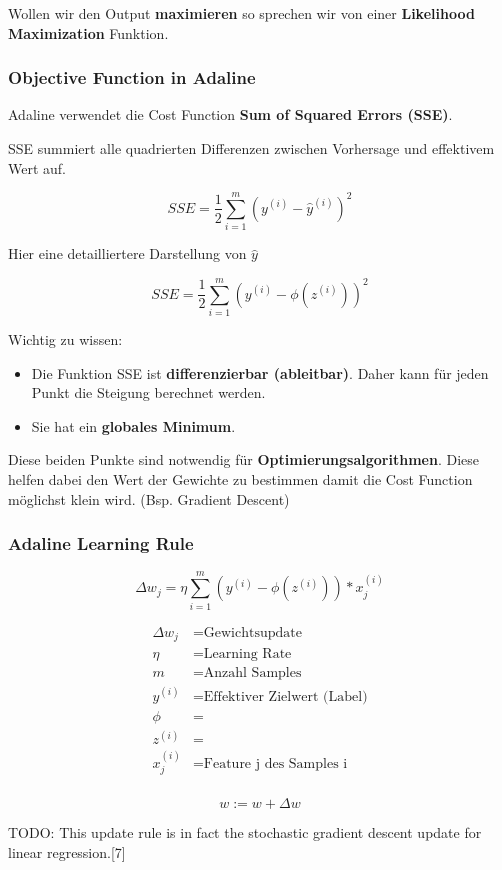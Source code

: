 Wollen wir den Output \textbf{maximieren} so sprechen wir von einer \textbf{Likelihood Maximization} Funktion.



 
\newpage
\subsubsection{Objective Function in Adaline}

Adaline verwendet die Cost Function \textbf{Sum of Squared Errors (SSE)}.

SSE summiert alle quadrierten Differenzen zwischen Vorhersage und effektivem Wert auf.

$$ SSE = \frac{1}{2} \sum_{i=1}^{m}(y^{(i)} - \hat{y}^{(i)})^{2} $$

Hier eine detailliertere Darstellung von $\hat{y}$

$$ SSE = \frac{1}{2} \sum_{i=1}^{m}(y^{(i)} - \phi(z^{(i)}))^{2} $$


Wichtig zu wissen:
\begin{itemize}
  \item Die Funktion SSE ist \textbf{differenzierbar (ableitbar)}. Daher kann für jeden Punkt die Steigung berechnet werden.
  \item Sie hat ein \textbf{globales Minimum}.
\end{itemize}


Diese beiden Punkte sind notwendig für \textbf{Optimierungsalgorithmen}. Diese helfen dabei den Wert der Gewichte zu bestimmen damit die Cost Function möglichst klein wird. (Bsp. Gradient Descent)


\subsubsection{Adaline Learning Rule}

$$ \Delta w_{j} = \eta \sum_{i=1}^{m} (y^{(i)} - \phi(z^{(i)})) * x_{j}^{(i)} $$


\begin{align*}
	\Delta w_{j}  &= \text{Gewichtsupdate} \\
	\eta &= \text{Learning Rate} \\
	m &= \text{Anzahl Samples}	\\
	y^{(i)} &= \text{Effektiver Zielwert (Label)} \\
	\phi &= \\
	z^{(i)} &= \\
	x_{j}^{(i)} &= \text{Feature j des Samples i} \\
\end{align*}


$$ w := w + \Delta w$$











TODO:
This update rule is in fact the stochastic gradient descent update for linear regression.[7]




